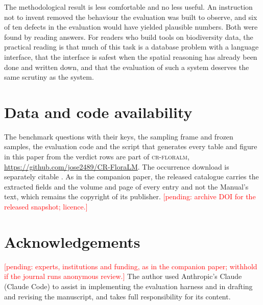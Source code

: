 \documentclass[11pt,a4paper]{article}
\newcommand{\pending}[1]{\textcolor{red}{[pending: #1]}}
\begin{document}
The methodological result is less comfortable and no less useful. An instruction not
to invent removed the behaviour the evaluation was built to observe, and six of ten
defects in the evaluation would have yielded plausible numbers. Both were found by
reading answers. For readers who build tools on biodiversity data, the practical
reading is that much of this task is a database problem with a language interface,
that the interface is safest when the spatial reasoning has already been done and
written down, and that the evaluation of such a system deserves the same scrutiny as
the system.

\section*{Data and code availability}
The benchmark questions with their keys, the sampling frame and frozen samples, the
evaluation code and the script that generates every table and figure in this paper
from the verdict rows are part of \textsc{cr-floralm},
\url{https://github.com/jose2489/CR-FloraLM}. The occurrence download is separately
citable \citep{gbif_snapshot}. As in the companion paper, the released catalogue
carries the extracted fields and the volume and page of every entry and not the
Manual's text, which remains the copyright of its publisher. \pending{archive DOI
for the released snapshot; licence.}

\section*{Acknowledgements}
\pending{experts, institutions and funding, as in the companion paper; withhold if
the journal runs anonymous review.} The author used Anthropic's Claude (Claude Code)
to assist in implementing the evaluation harness and in drafting and revising the
manuscript, and takes full responsibility for its content.


\end{document}
